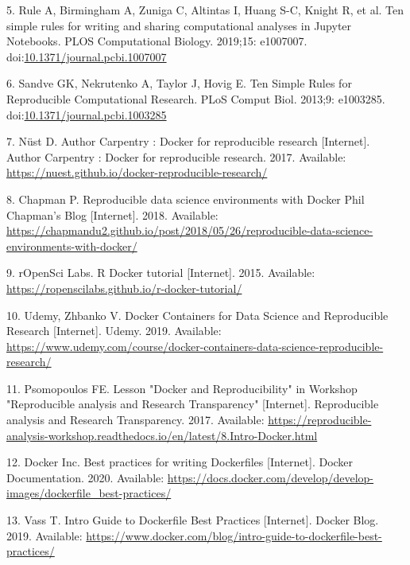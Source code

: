 \documentclass[10pt,letterpaper]{article}
\begin{document}
\leavevmode\hypertarget{ref-rule_ten_2019}{}%
5. Rule A, Birmingham A, Zuniga C, Altintas I, Huang S-C, Knight R, et
al. Ten simple rules for writing and sharing computational analyses in
Jupyter Notebooks. PLOS Computational Biology. 2019;15: e1007007.
doi:\href{https://doi.org/10.1371/journal.pcbi.1007007}{10.1371/journal.pcbi.1007007}

\leavevmode\hypertarget{ref-sandve_ten_2013}{}%
6. Sandve GK, Nekrutenko A, Taylor J, Hovig E. Ten Simple Rules for
Reproducible Computational Research. PLoS Comput Biol. 2013;9: e1003285.
doi:\href{https://doi.org/10.1371/journal.pcbi.1003285}{10.1371/journal.pcbi.1003285}

\leavevmode\hypertarget{ref-nust_author_2017}{}%
7. Nüst D. Author Carpentry : Docker for reproducible research
{[}Internet{]}. Author Carpentry : Docker for reproducible research.
2017. Available:
\url{https://nuest.github.io/docker-reproducible-research/}

\leavevmode\hypertarget{ref-chapman_reproducible_2018}{}%
8. Chapman P. Reproducible data science environments with Docker Phil
Chapman's Blog {[}Internet{]}. 2018. Available:
\url{https://chapmandu2.github.io/post/2018/05/26/reproducible-data-science-environments-with-docker/}

\leavevmode\hypertarget{ref-ropensci_labs_r_2015}{}%
9. rOpenSci Labs. R Docker tutorial {[}Internet{]}. 2015. Available:
\url{https://ropenscilabs.github.io/r-docker-tutorial/}

\leavevmode\hypertarget{ref-udemy_docker_2019}{}%
10. Udemy, Zhbanko V. Docker Containers for Data Science and
Reproducible Research {[}Internet{]}. Udemy. 2019. Available:
\url{https://www.udemy.com/course/docker-containers-data-science-reproducible-research/}

\leavevmode\hypertarget{ref-psomopoulos_lesson_2017}{}%
11. Psomopoulos FE. Lesson "Docker and Reproducibility" in Workshop
"Reproducible analysis and Research Transparency" {[}Internet{]}.
Reproducible analysis and Research Transparency. 2017. Available:
\url{https://reproducible-analysis-workshop.readthedocs.io/en/latest/8.Intro-Docker.html}

\leavevmode\hypertarget{ref-docker_inc_best_2020}{}%
12. Docker Inc. Best practices for writing Dockerfiles {[}Internet{]}.
Docker Documentation. 2020. Available:
\url{https://docs.docker.com/develop/develop-images/dockerfile_best-practices/}

\leavevmode\hypertarget{ref-vass_intro_2019}{}%
13. Vass T. Intro Guide to Dockerfile Best Practices {[}Internet{]}.
Docker Blog. 2019. Available:
\url{https://www.docker.com/blog/intro-guide-to-dockerfile-best-practices/}
\end{document}
